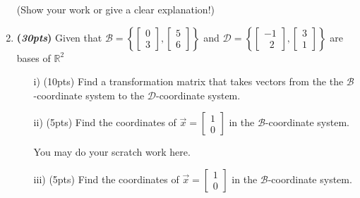 \documentclass[12pt]{article}%
\begin{document}
\begin{enumerate}
        (Show your work or give a clear explanation!)

        \vspace{9cm}
        
    \item \textbf{(\emph{30pts})} Given that \(
                \mathcal{B} = \left\{
                \begin{bmatrix} 0\\3 \end{bmatrix},
                \begin{bmatrix} 5\\6 \end{bmatrix}
                \right\}
                \)
                and
                \(
                \mathcal{D} = \left\{
                \begin{bmatrix} -1\\ \;\;2 \end{bmatrix},
                \begin{bmatrix} 3\\1 \end{bmatrix}
                \right\}
                \)
                are bases of \(\mathbb{R}^2\)
        \begin{itemize}
            \item[i)] (10pts) Find a transformation matrix that takes vectors from the the \(\mathcal{B}\)-coordinate system to the \(\mathcal{D}\)-coordinate system.

            \vspace{5cm}
            
            \item[ii)] (5pts) Find the coordinates of \(\vec{x} = \begin{bmatrix} 1\\0 \end{bmatrix}\)
                in the \(\mathcal{B}\)-coordinate system.
            
            \vspace{5cm}

            \newpage
        
            You may do your scratch work here.
        
            \newpage
            
            \item[iii)] (5pts) Find the coordinates of \(\vec{x} = \begin{bmatrix} 1\\0 \end{bmatrix}\)
                in the \(\mathcal{B}\)-coordinate system.


\end{itemize}
\end{enumerate}
\end{document}
